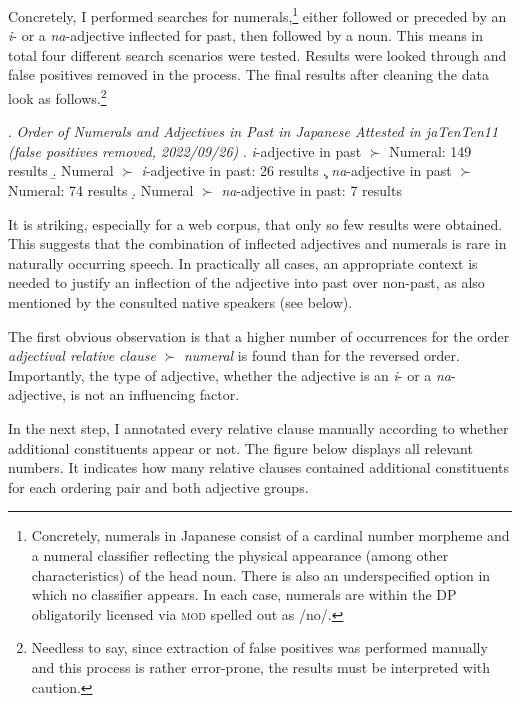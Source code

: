\documentclass [output=book,colorlinks,citecolor=brown]{langscibook}
\begin{document}
Concretely, I performed searches for numerals,\footnote{Concretely, numerals in Japanese consist of a cardinal number morpheme and a numeral classifier reflecting the physical appearance (among other characteristics) of the head noun. There is also an underspecified option in which no classifier appears. In each case, numerals are within the DP obligatorily licensed via \textsc{mod} spelled out as /no/.} either followed or preceded by an \textit{i}- or a \textit{na}-adjective inflected for past, then followed by a noun. This means in total four different search scenarios were tested. Results were looked through and false positives removed in the process. The final results after cleaning the data look as follows.\footnote{Needless to say, since extraction of false positives was performed manually and this process is rather error-prone, the results must be interpreted with caution.}


\ex. \emph{Order of Numerals and Adjectives in Past in Japanese Attested in jaTenTen11 (false positives removed, 2022/09/26)}
\a. \textit{i}-adjective in past $\succ$ Numeral: 149 results
\b. Numeral $\succ$ \textit{i}-adjective in past: 26 results
\c. \textit{na}-adjective in past $\succ$ Numeral: 74 results
\d. Numeral $\succ$ \textit{na}-adjective in past: 7 results

It is striking, especially for a web corpus, that only so few results were obtained. This suggests that the combination of inflected adjectives and numerals is rare in naturally occurring speech. In practically all cases, an appropriate context is needed to justify an inflection of the adjective into past over non-past, as also mentioned by the consulted native speakers (see below). %

The first obvious observation is that a higher number of occurrences for the order \textit{adjectival relative clause} $\succ$ \textit{numeral} is found than for the reversed order. Importantly, the type of adjective, whether the adjective is an \textit{i}- or a \textit{na}-adjective, is not an influencing factor. %

In the next step, I annotated every relative clause manually according to whether additional constituents appear or not. The figure below displays all relevant numbers. It indicates how many relative clauses contained additional constituents for each ordering pair and both adjective groups.

\newpage
\end{document}

